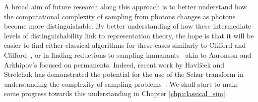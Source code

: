 A broad aim of future research along this approach is to better understand how the computational complexity of sampling from photons changes as photons become more distinguishable. 
By better understanding of how these intermediate levels of distinguishability link to representation theory, the hope is that it will be easier to find either classical algorithms for these cases similarly to Clifford and Clifford~\cite{clifford2017}, or in finding reductions to sampling immanants~\cite{burgisser2000immanants} akin to Aaronson and Arkhipov's focused on permanents. 
Indeed, recent work by Havl\'{i}\u{c}ek and Strelchuk has demonstrated the potential for the use of the Schur transform in understanding the complexity of sampling problems~\cite{havlicek2018}. We shall start to make some progress towards this understanding in Chapter \ref{chp:classical_sim}.